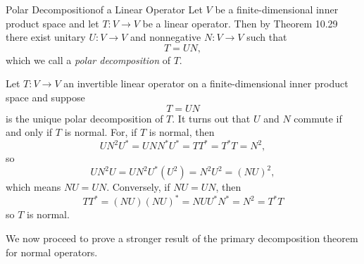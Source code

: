 \documentclass[linearalgebra]{subfiles}
\begin{document}
    \begin{definition}{Polar Decomposition}{of a Linear Operator}
        Let $V$ be a finite-dimensional inner product space and let $T:V\to V$ be a linear operator. Then by Theorem 10.29 there exist unitary $U:V\to V$ and nonnegative $N:V\to V$ such that
        \begin{equation*}
            T = UN,
        \end{equation*}
        which we call a \emph{polar decomposition} of $T$.
    \end{definition}

    \begin{remark}
        Let $T:V\to V$ an invertible linear operator on a finite-dimensional inner product space and suppose
        \begin{equation*}
            T = UN
        \end{equation*}
        is the unique polar decomposition of $T$. It turns out that $U$ and $N$ commute if and only if $T$ is normal. For, if $T$ is normal, then
        \begin{equation*}
            UN^2U^{*} = UNN^{*} U^{*} = TT^{*} = T^{*} T = N^2,
        \end{equation*}
        so
        \begin{equation*}
            UN^2U = UN^2U^{*} \left( U^2 \right) = N^2U^2 = \left( NU \right) ^2,
        \end{equation*}
        which means $NU = UN$. Conversely, if $NU=UN$, then
        \begin{equation*}
            TT^* = (NU)(NU)^{*} = NUU^{*} N^{*} = N^{2} = T^{*} T
        \end{equation*}
        so $T$ is normal.
    \end{remark}

    \begin{remark}
        We now proceed to prove a stronger result of the primary decomposition theorem for normal operators.
    \end{remark}
\end{document}
